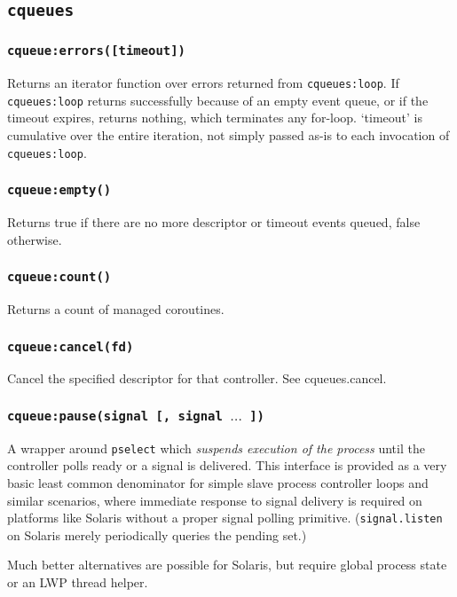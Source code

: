 \documentclass[11pt, oneside]{memoir}
\newcommand*{\cqueues}[0]{\texttt{cqueues}\xspace}
\newcommand*{\syscall}[1]{\texttt{#1}\xspace}
\newcommand*{\routine}[1]{\texttt{#1}\xspace}
\newcounter{toccols}
\newenvironment{Module}[1]{
	\subsection{\texttt{#1}}
	\addtocontents{toc}{
		\protect\begin{multicols}{\value{toccols}}
	}
}{
	\addtocontents{toc}{\protect\end{multicols}}
}
\begin{document}
\begin{Module}{\cqueues}
\subsubsection[\routine{cqueues:errors}]{\routine{cqueue:errors([timeout])}}

Returns an iterator function over errors returned from \routine{cqueues:loop}. If \routine{cqueues:loop} returns successfully because of an empty event queue, or if the timeout expires, returns nothing, which terminates any for-loop. `timeout' is cumulative over the entire iteration, not simply passed as-is to each invocation of \routine{cqueues:loop}.

\subsubsection[\routine{cqueues:empty}]{\routine{cqueue:empty()}}
Returns true if there are no more descriptor or timeout events queued, false otherwise.

\subsubsection[\routine{cqueues:count}]{\routine{cqueue:count()}}
Returns a count of managed coroutines.

\subsubsection[\routine{cqueues:cancel}]{\routine{cqueue:cancel(fd)}}
Cancel the specified descriptor for that controller. See cqueues.cancel.

\subsubsection[\routine{cqueues:pause}]{\routine{cqueue:pause(signal [, signal $\ldots$ ])}}
A wrapper around \syscall{pselect} which \emph{suspends execution of the process} until the controller polls ready or a signal is delivered. This interface is provided as a very basic least common denominator for simple slave process controller loops and similar scenarios, where immediate response to signal delivery is required on platforms like Solaris without a proper signal polling primitive. (\routine{signal.listen} on Solaris merely periodically queries the pending set.)

Much better alternatives are possible for Solaris, but require global process state or an LWP thread helper.

\end{Module}
\end{document}
